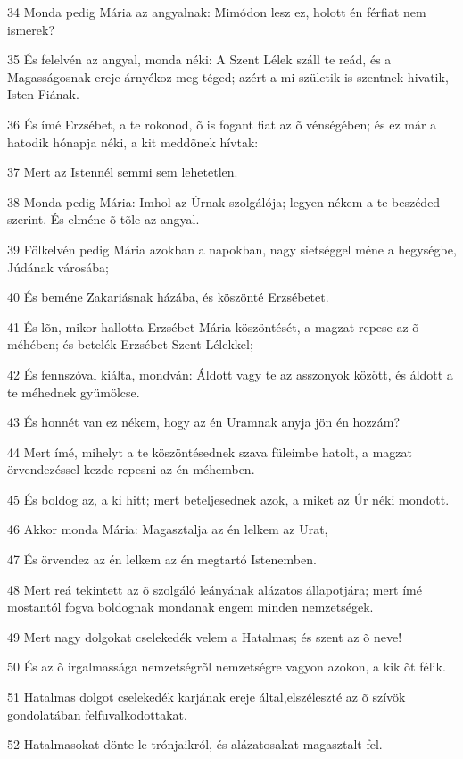 \par 34 Monda pedig Mária az angyalnak: Mimódon lesz ez, holott én férfiat nem ismerek?
\par 35 És felelvén az angyal, monda néki: A Szent Lélek száll te reád, és a Magasságosnak ereje árnyékoz meg téged; azért a mi születik is szentnek hivatik, Isten Fiának.
\par 36 És ímé Erzsébet, a te rokonod, õ is fogant fiat az õ vénségében; és ez már a hatodik hónapja néki, a kit meddõnek hívtak:
\par 37 Mert az Istennél semmi sem lehetetlen.
\par 38 Monda pedig Mária: Imhol az Úrnak szolgálója; legyen nékem a te beszéded szerint. És elméne õ tõle az angyal.
\par 39 Fölkelvén pedig Mária azokban a napokban, nagy sietséggel méne a hegységbe, Júdának városába;
\par 40 És beméne Zakariásnak házába, és köszönté Erzsébetet.
\par 41 És lõn, mikor hallotta Erzsébet Mária köszöntését, a magzat repese az õ méhében; és betelék Erzsébet Szent Lélekkel;
\par 42 És fennszóval kiálta, mondván: Áldott vagy te az asszonyok között, és áldott a te méhednek gyümölcse.
\par 43 És honnét van ez nékem, hogy az én Uramnak anyja jön én hozzám?
\par 44 Mert ímé, mihelyt a te köszöntésednek szava füleimbe hatolt, a magzat örvendezéssel kezde repesni az én méhemben.
\par 45 És boldog az, a ki hitt; mert beteljesednek azok, a miket az Úr néki mondott.
\par 46 Akkor monda Mária: Magasztalja az én lelkem az Urat,
\par 47 És örvendez az én lelkem az én megtartó Istenemben.
\par 48 Mert reá tekintett az õ szolgáló leányának alázatos állapotjára; mert ímé mostantól fogva boldognak mondanak engem minden nemzetségek.
\par 49 Mert nagy dolgokat cselekedék velem a Hatalmas; és szent az õ neve!
\par 50 És az õ irgalmassága nemzetségrõl nemzetségre vagyon azokon, a kik õt félik.
\par 51 Hatalmas dolgot cselekedék karjának ereje által,elszéleszté az õ szívök gondolatában felfuvalkodottakat.
\par 52 Hatalmasokat dönte le trónjaikról, és alázatosakat magasztalt fel.
